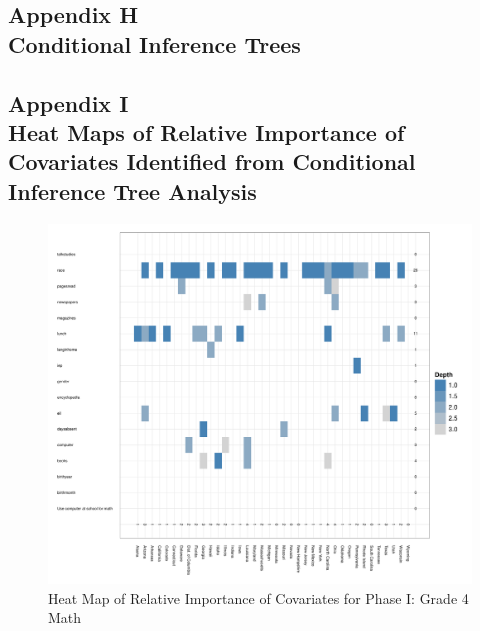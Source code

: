 \documentclass[letterpaper,12p,twoside]{article} %
\begin{document}
\cleardoublepage
{}
\subsection*{Appendix H\\Conditional Inference Trees}
\label{appendixtree}
\begin{singlespace}
 \clearpage
 \clearpage
 \clearpage
 \clearpage
 \clearpage
 \clearpage
 \clearpage
 \clearpage
\end{singlespace}


\cleardoublepage
{}
\subsection*{Appendix I\\Heat Maps of Relative Importance of Covariates Identified from Conditional Inference Tree Analysis}
\label{appendixtree}

\begin{figure}[h]
\begin{center}
\includegraphics[width=\textwidth]{../Figures/g4mathtreeHeat.pdf}
\caption{Heat Map of Relative Importance of Covariates for Phase I: Grade 4 Math}
\label{fig:g4math:treeheat}
\end{center}
\end{figure}
\end{document}
